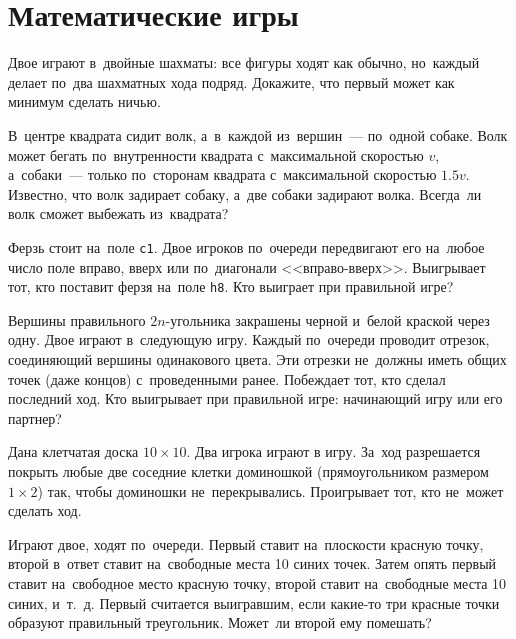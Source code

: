 
\section*{Математические игры}



\begin{problems}

\item
Двое играют в~двойные шахматы: все фигуры ходят как обычно, но~каждый делает
по~два шахматных хода подряд.
Докажите, что первый может как минимум сделать ничью.

\item
В~центре квадрата сидит волк, а~в~каждой из~вершин~--- по~одной собаке.
Волк может бегать по~внутренности квадрата с~максимальной скоростью $v$,
а~собаки~--- только по~сторонам квадрата с~максимальной скоростью $1.5v$.
Известно, что волк задирает собаку, а~две собаки задирают волка.
Всегда~ли волк сможет выбежать из~квадрата?

\item
Ферзь стоит на~поле \texttt{c1}.
Двое игроков по~очереди передвигают его на~любое число поле вправо, вверх или
по~диагонали <<вправо-вверх>>.
Выигрывает тот, кто поставит ферзя на~поле \texttt{h8}.
Кто выиграет при правильной игре?

\item
Вершины правильного $2n$-угольника закрашены черной и~белой краской через одну.
Двое играют в~следующую игру.
Каждый по~очереди проводит отрезок, соединяющий вершины одинакового цвета.
Эти отрезки не~должны иметь общих точек (даже концов) с~проведенными ранее.
Побеждает тот, кто сделал последний ход.
Кто выигрывает при правильной игре: начинающий игру или его партнер?

\item
Дана клетчатая доска $10 \times 10$.
Два игрока играют в игру.
За~ход разрешается покрыть любые две соседние клетки доминошкой
(прямоугольником размером $1 \times 2$) так, чтобы доминошки не~перекрывались.
Проигрывает тот, кто не~может сделать ход.

\item
Играют двое, ходят по~очереди.
Первый ставит на~плоскости красную точку, второй в~ответ ставит на~свободные
места 10 синих точек.
Затем опять первый ставит на~свободное место красную точку, второй ставит
на~свободные места 10 синих, и~т.~д.
Первый считается выигравшим, если какие-то три красные точки образуют
правильный треугольник.
Может~ли второй ему помешать?


\end{problems}
